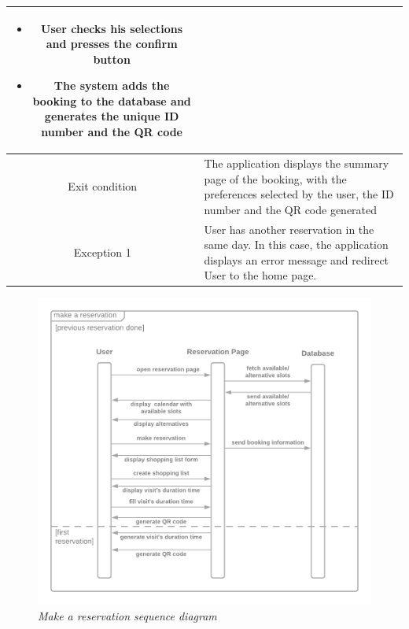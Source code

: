 \documentclass[table, 12pt]{article}
\begin{document}
\begin{longtable}{|c| p{10cm}|}
\begin{itemize}[nosep,after=\strut]
        \item User checks his selections and presses the confirm button
        \item The system adds the booking to the database and generates the unique ID number and the QR code
    \end{itemize}                                                                                                                   \\
    \hline
    Exit condition   & The application displays the summary page of the booking, with the preferences selected by the user, the ID number and the QR code generated
    \\
    \hline
    \hline
    Exception 1      & User has another reservation in the same day. In this case, the application displays an error message and redirect User to the home page.    \\
    \hline
\end{longtable}




\begin{figure}[H]
    \centering
    \includegraphics[scale=0.4]{assets/book-a-visit.png}
    \caption{\textit{Make a reservation sequence diagram}}
\end{figure}
\newpage
\end{document}
